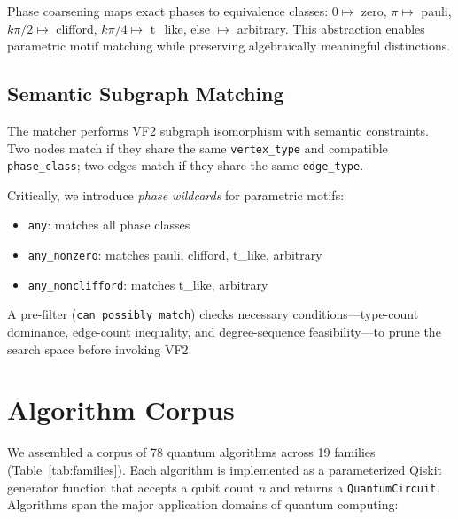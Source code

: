 \documentclass[twocolumn,prl,amsmath,amssymb,superscriptaddress]{revtex4-2}
\begin{document}
Phase coarsening maps exact phases to equivalence classes: $0 \mapsto$ zero, $\pi \mapsto$ pauli, $k\pi/2 \mapsto$ clifford, $k\pi/4 \mapsto$ t\_like, else $\mapsto$ arbitrary.
This abstraction enables parametric motif matching while preserving algebraically meaningful distinctions.

\subsection{Semantic Subgraph Matching}

The matcher performs VF2 subgraph isomorphism with semantic constraints.
Two nodes match if they share the same \texttt{vertex\_type} and compatible \texttt{phase\_class}; two edges match if they share the same \texttt{edge\_type}.

Critically, we introduce \emph{phase wildcards} for parametric motifs:
\begin{itemize}
    \item \texttt{any}: matches all phase classes
    \item \texttt{any\_nonzero}: matches pauli, clifford, t\_like, arbitrary
    \item \texttt{any\_nonclifford}: matches t\_like, arbitrary
\end{itemize}

A pre-filter (\texttt{can\_possibly\_match}) checks necessary conditions---type-count dominance, edge-count inequality, and degree-sequence feasibility---to prune the search space before invoking VF2.

\section{Algorithm Corpus}
\label{sec:corpus}

We assembled a corpus of 78 quantum algorithms across 19 families (Table~\ref{tab:families}).
Each algorithm is implemented as a parameterized Qiskit generator function that accepts a qubit count $n$ and returns a \texttt{QuantumCircuit}.
Algorithms span the major application domains of quantum computing:
\end{document}
